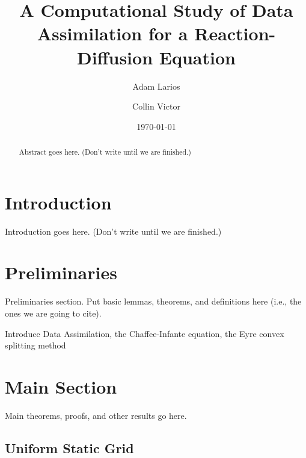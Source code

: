 \documentclass[12pt]{amsart}
\title[Data Assimilation for Reaction-Diffusion]{A Computational Study of Data Assimilation for a Reaction-Diffusion Equation}
\date{\today}
\author{Adam Larios}
\author{Collin Victor}
\theoremstyle{plain}
\theoremstyle{definition}
\theoremstyle{remark}
\numberwithin{equation}{section} %
\numberwithin{figure}{section}   %
\begin{document}
\begin{abstract}
 Abstract goes here. (Don't write until we are finished.)
\end{abstract}

\maketitle
\thispagestyle{empty}%


\noindent
\section{Introduction}\label{secInt}
\noindent
Introduction goes here. (Don't write until we are finished.)

\section{Preliminaries}\label{secPre}
\noindent
Preliminaries section.  Put basic lemmas, theorems, and definitions here (i.e., the ones we are going to cite).

Introduce Data Assimilation, the Chaffee-Infante equation, the Eyre convex splitting method

 \section{Main Section}\label{secNeatSection}
\noindent
Main theorems, proofs, and other results go here.

\subsection*{Uniform Static Grid}
\end{document}
